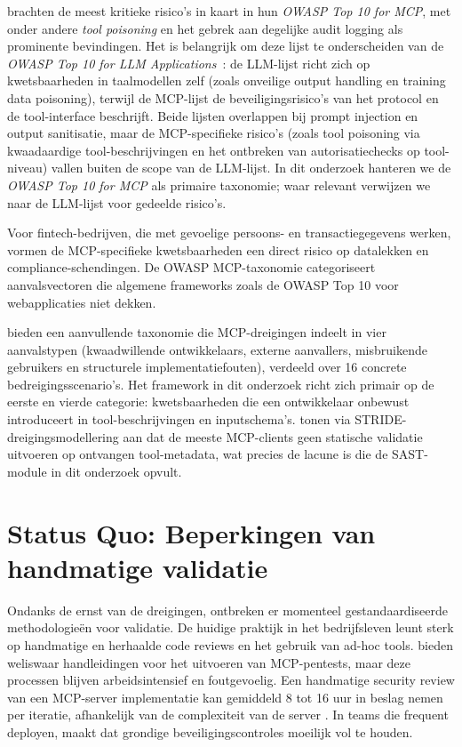 \textcite{OWASP2025} brachten de meest kritieke risico's in kaart in hun \emph{OWASP Top 10 for MCP}, met onder andere \emph{tool poisoning} en het gebrek aan degelijke audit logging als prominente bevindingen. Het is belangrijk om deze lijst te onderscheiden van de \emph{OWASP Top 10 for LLM Applications}~\autocite{OWASP2025}: de LLM-lijst richt zich op kwetsbaarheden in taalmodellen zelf (zoals onveilige output handling en training data poisoning), terwijl de MCP-lijst de beveiligingsrisico's van het protocol en de tool-interface beschrijft. Beide lijsten overlappen bij prompt injection en output sanitisatie, maar de MCP-specifieke risico's (zoals tool poisoning via kwaadaardige tool-beschrijvingen en het ontbreken van autorisatiechecks op tool-niveau) vallen buiten de scope van de LLM-lijst. In dit onderzoek hanteren we de \emph{OWASP Top 10 for MCP} als primaire taxonomie; waar relevant verwijzen we naar de LLM-lijst voor gedeelde risico's.

Voor fintech-bedrijven, die met gevoelige persoons- en transactiegegevens werken, vormen de MCP-specifieke kwetsbaarheden een direct risico op datalekken en compliance-schendingen. De OWASP MCP-taxonomie categoriseert aanvalsvectoren die algemene frameworks zoals de OWASP Top 10 voor webapplicaties niet dekken.

\textcite{hou2025mcplandscape} bieden een aanvullende taxonomie die MCP-dreigingen indeelt in vier aanvalstypen (kwaadwillende ontwikkelaars, externe aanvallers, misbruikende gebruikers en structurele implementatiefouten), verdeeld over 16 concrete bedreigingsscenario's. Het framework in dit onderzoek richt zich primair op de eerste en vierde categorie: kwetsbaarheden die een ontwikkelaar onbewust introduceert in tool-beschrijvingen en inputschema's. \textcite{huang2026mcpthreatmodeling} tonen via STRIDE-dreigings\-modellering aan dat de meeste MCP-clients geen statische validatie uitvoeren op ontvangen tool-metadata, wat precies de lacune is die de SAST-module in dit onderzoek opvult.

\section{Status Quo: Beperkingen van handmatige validatie}

Ondanks de ernst van de dreigingen, ontbreken er momenteel gestandaardiseerde methodologieën voor validatie. De huidige praktijk in het bedrijfsleven leunt sterk op handmatige en herhaalde code reviews en het gebruik van ad-hoc tools. \textcite{Uproot2025} bieden weliswaar handleidingen voor het uitvoeren van MCP-pentests, maar deze processen blijven arbeidsintensief en foutgevoelig. Een handmatige security review van een MCP-server implementatie kan gemiddeld 8 tot 16 uur in beslag nemen per iteratie, afhankelijk van de complexiteit van de server \autocite{Uproot2025}. In teams die frequent deployen, maakt dat grondige beveiligingscontroles moeilijk vol te houden.


